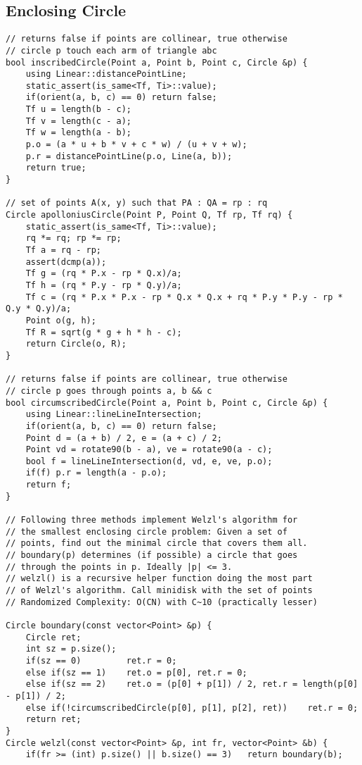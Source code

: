 \documentclass[FSZ,a4paper,onesided]{article}
\begin{document}
\begin{multicols*}{\COLS}
\subsection{Enclosing Circle}
\begin{lstlisting}
// returns false if points are collinear, true otherwise
// circle p touch each arm of triangle abc
bool inscribedCircle(Point a, Point b, Point c, Circle &p) {
    using Linear::distancePointLine;
    static_assert(is_same<Tf, Ti>::value);
    if(orient(a, b, c) == 0) return false;
    Tf u = length(b - c);
    Tf v = length(c - a);
    Tf w = length(a - b);
    p.o = (a * u + b * v + c * w) / (u + v + w);
    p.r = distancePointLine(p.o, Line(a, b));
    return true;
}

// set of points A(x, y) such that PA : QA = rp : rq
Circle apolloniusCircle(Point P, Point Q, Tf rp, Tf rq) {
    static_assert(is_same<Tf, Ti>::value);
    rq *= rq; rp *= rp;
    Tf a = rq - rp;
    assert(dcmp(a));
    Tf g = (rq * P.x - rp * Q.x)/a;
    Tf h = (rq * P.y - rp * Q.y)/a;
    Tf c = (rq * P.x * P.x - rp * Q.x * Q.x + rq * P.y * P.y - rp * Q.y * Q.y)/a;
    Point o(g, h);
    Tf R = sqrt(g * g + h * h - c);
    return Circle(o, R);
}

// returns false if points are collinear, true otherwise
// circle p goes through points a, b && c
bool circumscribedCircle(Point a, Point b, Point c, Circle &p) {
    using Linear::lineLineIntersection;
    if(orient(a, b, c) == 0) return false;
    Point d = (a + b) / 2, e = (a + c) / 2;
    Point vd = rotate90(b - a), ve = rotate90(a - c);
    bool f = lineLineIntersection(d, vd, e, ve, p.o);
    if(f) p.r = length(a - p.o);
    return f;
}

// Following three methods implement Welzl's algorithm for
// the smallest enclosing circle problem: Given a set of
// points, find out the minimal circle that covers them all.
// boundary(p) determines (if possible) a circle that goes
// through the points in p. Ideally |p| <= 3.
// welzl() is a recursive helper function doing the most part
// of Welzl's algorithm. Call minidisk with the set of points
// Randomized Complexity: O(CN) with C~10 (practically lesser)

Circle boundary(const vector<Point> &p) {
    Circle ret;
    int sz = p.size();
    if(sz == 0)         ret.r = 0;
    else if(sz == 1)    ret.o = p[0], ret.r = 0;
    else if(sz == 2)    ret.o = (p[0] + p[1]) / 2, ret.r = length(p[0] - p[1]) / 2;
    else if(!circumscribedCircle(p[0], p[1], p[2], ret))    ret.r = 0;
    return ret;
}
Circle welzl(const vector<Point> &p, int fr, vector<Point> &b) {
    if(fr >= (int) p.size() || b.size() == 3)   return boundary(b);


\end{lstlisting}
\end{multicols*}
\end{document}
